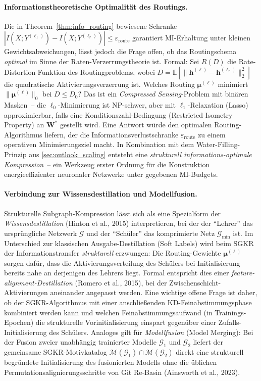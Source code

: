 ﻿\documentclass[12pt, a4paper, openany]{report}
\newcommand{\E}{\mathbb{E}}
\newcommand{\calG}{\mathcal{G}}
\newcommand{\calM}{\mathcal{M}}
\begin{document}
\paragraph{Informationstheoretische Optimalität des Routings.}
Die in Theorem~\ref{thm:info_routing} bewiesene Schranke
$|I(X;Y^{(\ell_1)}) - I(X;Y^{(\ell_r)})| \leq \varepsilon_{\mathrm{route}}$
garantiert MI-Erhaltung unter kleinen Gewichtsabweichungen, lässt jedoch
die Frage offen, ob das Routingschema \emph{optimal} im Sinne der
Raten-Verzerrungstheorie ist.  Formal: Sei $R(D)$ die Rate-Distortion-Funktion
des Routingproblems, wobei
$D = \E[\|\bm{h}^{(\ell)} - \bm{h}^{(\ell_r)}\|_2^2]$
die quadratische Aktivierungsverzerrung ist.  Welches Routing $\bm{\mu}^{(\ell)}$
minimiert $\|\bm{\mu}^{(\ell)}\|_0$ bei $D \leq D_0$?  Das ist ein
\emph{Compressed Sensing}-Problem mit binären Masken~-- die $\ell_0$-Minimierung
ist NP-schwer, aber mit $\ell_1$-Relaxation (Lasso) approximierbar, falls
eine Konditionszahl-Bedingung (Restricted Isometry Property) an $\bm{W}^*$
gestellt wird.  Eine Antwort würde den optimalen Routing-Algorithmus liefern,
der die Informationsverlustschranke $\varepsilon_{\mathrm{route}}$ zu einem
operativen Minimierungsziel macht.  In Kombination mit dem
Water-Filling-Prinzip aus \cref{sec:outlook_scaling} entsteht eine
\emph{strukturell informations-optimale Kompression}~-- ein Werkzeug erster
Ordnung für die Konstruktion energieeffizienter neuronaler Netzwerke unter
gegebenen MI-Budgets.

\paragraph{Verbindung zur Wissensdestillation und Modellfusion.}
Strukturelle Subgraph-Kompression lässt sich als eine Spezialform der
\emph{Wissensdestillation} (Hinton et al., 2015) interpretieren, bei der
der ``Lehrer'' das ursprüngliche Netzwerk $\calG$ und der ``Schüler'' das
komprimierte Netz $\calG_{\min}$ ist.  Im Unterschied zur klassischen
Ausgabe-Destillation (Soft Labels) wird beim SGKR der Informationstransfer
\emph{strukturell} erzwungen: Die Routing-Gewichte $\bm{\mu}^{(\ell)}$
sorgen dafür, dass die Aktivierungsverteilung des Schülers bei Initialisierung
bereits nahe an derjenigen des Lehrers liegt.  Formal entspricht dies einer
\emph{feature-alignment-Destillation} (Romero et al., 2015), bei der
Zwischenschicht-Aktivierungen aneinander angepasst werden.  Eine wichtige
offene Frage ist daher, ob der SGKR-Algorithmus mit einer anschließenden
KD-Feinabstimmungsphase kombiniert werden kann und welchen Feinabstimmungs\-aufwand
(in Trainings-Epochen) die strukturelle Vorinitialisierung einspart gegenüber
einer Zufalls-Initialisierung des Schülers.  Analoges gilt für
\emph{Modellfusion} (Model Merging): Bei der Fusion zweier unabhängig
trainierter Modelle $\calG_1$ und $\calG_2$ liefert der gemeinsame
SGKR-Motivkatalog $\calM(\calG_1) \cap \calM(\calG_2)$ direkt eine
strukturell begründete Initialisierung des fusionierten Modells ohne die
üblichen Permutationsalignierungsschritte von Git Re-Basin (Ainsworth
et al., 2023).
\end{document}

